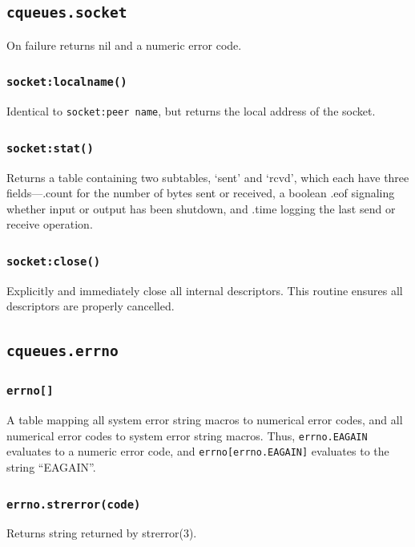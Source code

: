 \documentclass[11pt, oneside]{memoir}
\newcommand*{\fn}[1]{\texttt{#1}\xspace}
\newcounter{toccols}
\newenvironment{Module}[1]{
	\subsection{\texttt{#1}}
	\addtocontents{toc}{
		\protect\begin{multicols}{\value{toccols}}
	}
}{
	\addtocontents{toc}{\protect\end{multicols}}
}
\begin{document}
\begin{Module}{cqueues.socket}
On failure returns nil and a numeric error code.

\subsubsection[\fn{socket:localname}]{\fn{socket:localname()}}

Identical to \fn{socket:peer name}, but returns the local address of the socket.

\subsubsection[\fn{socket:stat}]{\fn{socket:stat()}}

Returns a table containing two subtables, `sent' and `rcvd', which each have three fields---.count for the number of bytes sent or received, a boolean .eof  signaling whether input or output has been shutdown, and .time logging the last send or receive operation.

\subsubsection[\fn{socket:close}]{\fn{socket:close()}}
Explicitly and immediately close all internal descriptors. This routine ensures all descriptors are properly cancelled.

\end{Module}

\begin{Module}{cqueues.errno}

\subsubsection[\fn{errno[]}]{\fn{errno[]}}
A table mapping all system error string macros to numerical error codes, and all numerical error codes to system error string macros. Thus, \texttt{errno.EAGAIN} evaluates to a numeric error code, and \texttt{errno[errno.EAGAIN]} evaluates to the string ``EAGAIN''.

\subsubsection[\fn{errno.strerror}]{\fn{errno.strerror(code)}}
Returns string returned by strerror(3).

\end{Module}
\end{document}

